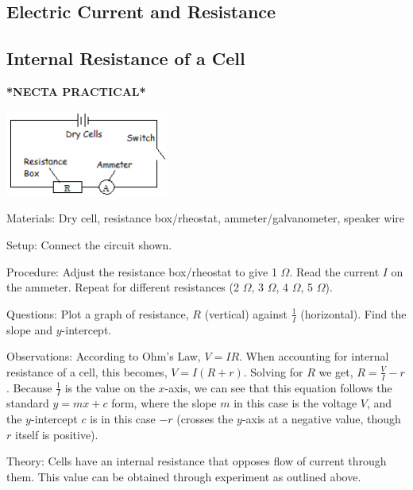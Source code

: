 \begin{multicols}{2}

\section*{Electric Current and Resistance}


\subsection{Internal Resistance of a Cell}
\textbf{*NECTA PRACTICAL*}

\begin{center}
\includegraphics[width=0.4\textwidth]{./img/ohms-law.png}
\end{center}

\begin{description*}
\item[Materials:]{Dry cell, resistance box/rheostat, ammeter/galvanometer, speaker wire}
\item[Setup:]{Connect the circuit shown.}
\item[Procedure:]{Adjust the resistance box/rheostat to give 1 $\Omega$. Read the current $I$ on the ammeter. Repeat for different resistances (2 $\Omega$, 3 $\Omega$, 4 $\Omega$, 5 $\Omega$).}
\item[Questions:]{Plot a graph of resistance, $R$ (vertical) against $\frac{1}{I}$ (horizontal). Find the slope and $y$-intercept.}
\item[Observations:]{According to Ohm's Law, $V = IR$. When accounting for internal resistance of a cell, this becomes, $V = I(R + r)$. Solving for $R$ we get, $R = \frac{V}{I} - r$. Because $\frac{1}{I}$ is the value on the $x$-axis, we can see that this equation follows the standard $y=mx+c$ form, where the slope $m$ in this case is the voltage $V$, and the $y$-intercept $c$ is in this case $-r$ (crosses the $y$-axis at a negative value, though $r$ itself is positive).}
\item[Theory:]{Cells have an internal resistance that opposes flow of current through them. This value can be obtained through experiment as outlined above.}
\end{description*}


\end{multicols}

